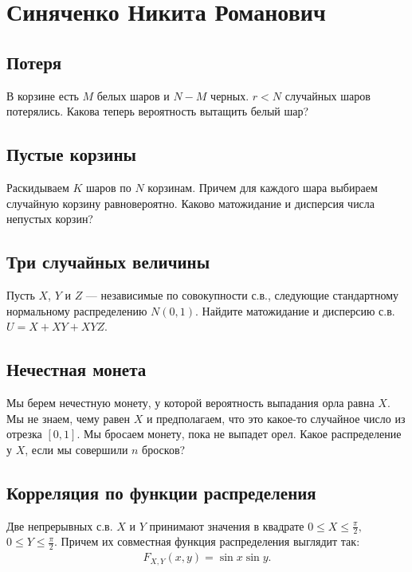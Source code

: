 \documentclass[12pt]{article}
\begin{document}
\newpage
\section{Синяченко Никита Романович}

\subsection{Потеря}

В корзине есть $M$ белых шаров и $N - M$ черных. $r < N$ случайных шаров потерялись. Какова теперь вероятность вытащить белый шар?



\subsection{Пустые корзины}

Раскидываем $K$ шаров по $N$ корзинам. Причем для каждого шара выбираем случайную корзину равновероятно. Каково матожидание и дисперсия числа непустых корзин?



\subsection{Три случайных величины}

Пусть $X$, $Y$ и $Z$ --- независимые по совокупности с.в., следующие стандартному нормальному распределению $N(0, 1)$. Найдите матожидание и дисперсию с.в. $U = X + XY + XYZ$. 



\subsection{Нечестная монета}

Мы берем нечестную монету, у которой вероятность выпадания орла равна $X$. Мы не знаем, чему равен $X$ и предполагаем, что это какое-то случайное число из отрезка $[0, 1]$. Мы бросаем монету, пока не выпадет орел. Какое распределение у $X$, если мы совершили $n$ бросков?



\subsection{Корреляция по функции распределения}

Две непрерывных с.в. $X$ и $Y$ принимают значения в квадрате $0 \le X \le \frac{\pi}{2},$ $0 \le Y \le \frac{\pi}{2}$. Причем их совместная функция распределения выглядит так:
\begin{align*}
    F_{X, Y} (x, y) = \sin x \sin y.
\end{align*}
\end{document}
